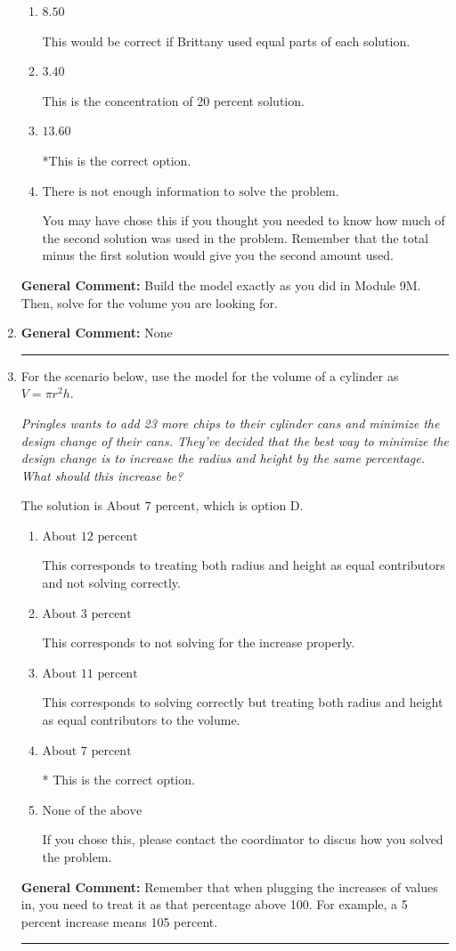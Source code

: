 \documentclass{extbook}[14pt]
\newcommand{\litem}[1]{\item #1

\rule{\textwidth}{0.4pt}}
\begin{document}
\begin{enumerate}
{\begin{enumerate}[label=\Alph*.]
This was a random value. If this was not a guess, contact the coordinator to talk about how you got this value.
\item \( 8.50 \)

This would be correct if Brittany used equal parts of each solution.
\item \( 3.40 \)

This is the concentration of 20 percent solution.
\item \( 13.60 \)

*This is the correct option.
\item \( \text{There is not enough information to solve the problem.} \)

You may have chose this if you thought you needed to know how much of the second solution was used in the problem. Remember that the total minus the first solution would give you the second amount used.
\end{enumerate}

\textbf{General Comment:} Build the model exactly as you did in Module 9M. Then, solve for the volume you are looking for.
}
\litem{


\textbf{General Comment:} None
}
\litem{
For the scenario below, use the model for the volume of a cylinder as $V = \pi r^2 h$.

\begin{center}
    \textit{ Pringles wants to add 23 \text{percent} more chips to their cylinder cans and minimize the design change of their cans. They've decided that the best way to minimize the design change is to increase the radius and height by the same percentage. What should this increase be? }
\end{center}
The solution is \( \text{About } 7 \text{ percent} \), which is option D.\begin{enumerate}[label=\Alph*.]
\item \( \text{About } 12 \text{ percent} \)

This corresponds to treating both radius and height as equal contributors and not solving correctly.
\item \( \text{About } 3 \text{ percent} \)

This corresponds to not solving for the increase properly.
\item \( \text{About } 11 \text{ percent} \)

This corresponds to solving correctly but treating both radius and height as equal contributors to the volume.
\item \( \text{About } 7 \text{ percent} \)

* This is the correct option.
\item \( \text{None of the above} \)

If you chose this, please contact the coordinator to discus how you solved the problem.
\end{enumerate}

\textbf{General Comment:} Remember that when plugging the increases of values in, you need to treat it as that percentage above 100. For example, a 5 percent increase means 105 percent.
}
\end{enumerate}
\end{document}
